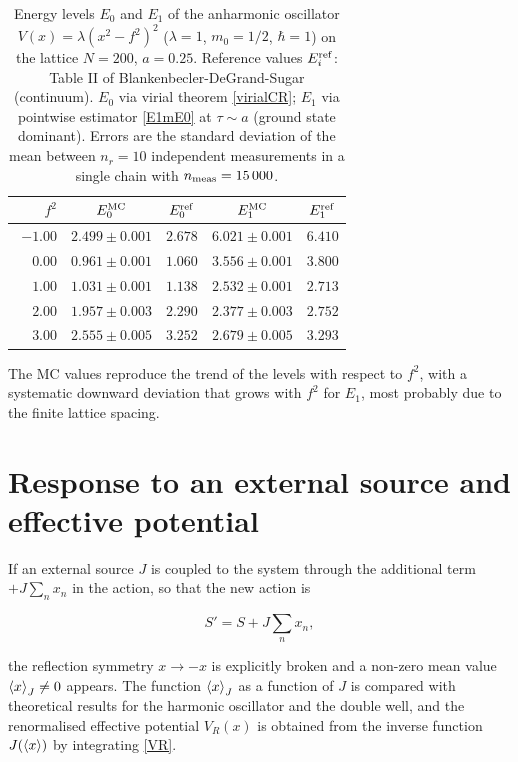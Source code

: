 \documentclass[11pt,a4paper,twoside,pdf]{article}
\numberwithin{equation}{section}
\begin{document}
\begin{table}[H]
    \centering
    \begin{tabular}{rcccc}
    \toprule
    $f^2$ & $E_0^{\rm MC}$ & $E_0^{\rm ref}$ & $E_1^{\rm MC}$ & $E_1^{\rm ref}$ \\
    \midrule
    $-1.00$ & $2.499 \pm 0.001$ & $2.678$ & $6.021 \pm 0.001$ & $6.410$ \\
    $\phantom{-}0.00$ & $0.961 \pm 0.001$ & $1.060$ & $3.556 \pm 0.001$ & $3.800$ \\
    $\phantom{-}1.00$ & $1.031 \pm 0.001$ & $1.138$ & $2.532 \pm 0.001$ & $2.713$ \\
    $\phantom{-}2.00$ & $1.957 \pm 0.003$ & $2.290$ & $2.377 \pm 0.003$ & $2.752$ \\
    $\phantom{-}3.00$ & $2.555 \pm 0.005$ & $3.252$ & $2.679 \pm 0.005$ & $3.293$ \\
    \bottomrule
    \end{tabular}
    \caption{Energy levels $E_0$ and $E_1$ of the anharmonic oscillator $V(x) = \lambda(x^2-f^2)^2$ ($\lambda = 1$, $m_0 = 1/2$, $\hbar = 1$) on the lattice $N=200$, $a = 0.25$. Reference values $E_i^{\rm ref}$: Table II of Blankenbecler-DeGrand-Sugar \cite{degrand1980numerical} (continuum). $E_0$ via virial theorem \ref{virialCR}; $E_1$ via pointwise estimator \ref{E1mE0} at $\tau \sim a$ (ground state dominant). Errors are the standard deviation of the mean between $n_r = 10$ independent measurements in a single chain with $n_{\rm meas} = 15\,000$.}
    \label{tab:niveles}
\end{table}


The MC values reproduce the trend of the levels with respect to $f^2$, with a systematic downward deviation that grows with $f^2$ for $E_1$, most probably due to the finite lattice spacing.




\section{Response to an external source and effective potential}

If an external source $J$ is coupled to the system through the additional term $+J\sum_n x_n$ in the action, so that the new action is


\begin{equation}
    S' = S + J\sum_n x_n,
\end{equation}


the reflection symmetry $x \to -x$ is explicitly broken and a non-zero mean value $\braket{x}_J \neq 0$ appears. The function $\braket{x}_J$ as a function of $J$ is compared with theoretical results for the harmonic oscillator and the double well, and the renormalised effective potential $V_R(x)$ is obtained from the inverse function $J(\braket{x})$ by integrating \ref{VR}.
\end{document}
